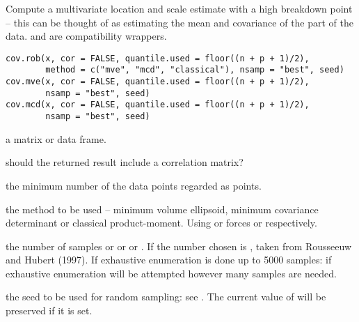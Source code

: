 \begin{Description}\relax
Compute a multivariate location and scale estimate with a high
breakdown point -- this can be thought of as estimating the mean and
covariance of the  part of the data.  and
 are compatibility wrappers.\end{Description}
\begin{Usage}
\begin{verbatim}
cov.rob(x, cor = FALSE, quantile.used = floor((n + p + 1)/2),
        method = c("mve", "mcd", "classical"), nsamp = "best", seed)
cov.mve(x, cor = FALSE, quantile.used = floor((n + p + 1)/2),
        nsamp = "best", seed)
cov.mcd(x, cor = FALSE, quantile.used = floor((n + p + 1)/2),
        nsamp = "best", seed)
\end{verbatim}
\end{Usage}
\begin{Arguments}
\begin{ldescription}
\item[\code{x}] a matrix or data frame.

\item[\code{cor}] should the returned result include a correlation matrix?

\item[\code{quantile.used}] the minimum number of the data points regarded as  points.

\item[\code{method}] the method to be used -- minimum volume ellipsoid, minimum
covariance determinant or classical product-moment. Using
 or  forces  or 
respectively.

\item[\code{nsamp}] the number of samples or  or  or
.
If  the number chosen is , taken
from Rousseeuw and Hubert (1997). If  exhaustive
enumeration is done up to 5000 samples: if 
exhaustive enumeration will be attempted however many samples are needed.

\item[\code{seed}] the seed to be used for random sampling: see . The
current value of  will be preserved if it is set.

\end{ldescription}
\end{Arguments}
